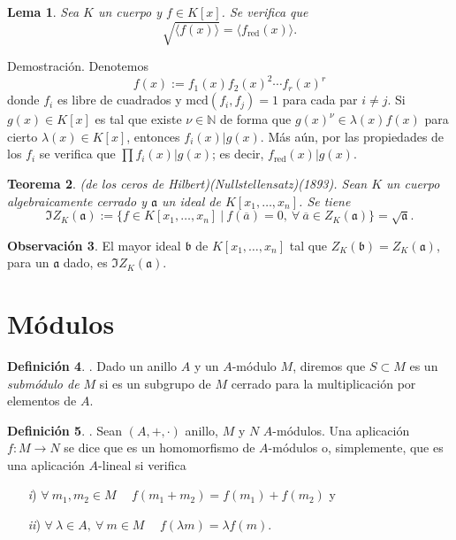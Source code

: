 \documentclass[a4paper,12pt]{article}
\newcommand{\N}{\mathbb{N}}
\newcommand{\af}{\mathfrak{a}}
\newcommand{\bfr}{\mathfrak{b}}
\newtheorem{theorem}{Teorema}
\newtheorem{lemma}[theorem]{Lema}
\theoremstyle{definition}
\newtheorem{definition}[theorem]{Definición}
\newtheorem{remark}[theorem]{Observación}
\begin{document}
\begin{lemma} Sea $K$ un cuerpo y $f\in K[x]$. Se verifica que$$\sqrt{\langle f(x)\rangle}=\langle f_{\text{red}}(x)\rangle.$$
\end{lemma}
Demostración. Denotemos$$f(x):=f_1(x)f_2(x)^2\cdots f_r(x)^r$$donde $f_i$ es libre de cuadrados y $\text{mcd}(f_i,f_j)=1$ para cada par $i\neq j$. Si $g(x)\in K[x]$ es tal que existe $\nu\in\N$ de forma que $g(x)^\nu\in\lambda(x)f(x)$ para cierto $\lambda(x)\in K[x]$, entonces $f_i(x)|g(x)$. Más aún, por las propiedades de los $f_i$ se verifica que $\prod f_i(x)|g(x)$; es decir, $f_\text{red}(x)|g(x)$.

\begin{theorem} (de los ceros de Hilbert)(\textit{Nullstellensatz})(1893). Sean $K$ un cuerpo algebraicamente cerrado y $\af$ un ideal de $K[x_1,\dots,x_n]$. Se tiene$$\mathfrak{I}Z_K(\af):=\{f\in K[x_1,\dots,x_n]\ |\ f(\overline{a})=0,\ \forall\ \overline{a}\in Z_K(\af)\}=\sqrt{\af}.$$
\end{theorem}

\begin{remark} El mayor ideal $\bfr$ de $K[x_1,\dots,x_n]$ tal que $Z_K(\bfr)=Z_K(\af)$, para un $\af$ dado, es $\mathfrak{I}Z_K(\af)$.
\end{remark}

\section{Módulos}
\begin{definition}. Dado un anillo $A$ y un $A$-módulo $M$, diremos que $S\subset M$ es un \textit{submódulo de $M$} si es un subgrupo de $M$ cerrado para la multiplicación por elementos de $A$.
\end{definition}

\begin{definition}. Sean $(A,+,\cdot)$ anillo, $M$ y $N$ $A$-módulos. Una aplicación $f:M\longrightarrow N$ se dice que es un homomorfismo de $A$-módulos o, simplemente, que es una aplicación $A$-lineal si verifica
\begin{itemize}
    \item[\textit{i})] $\forall\ m_1,m_2\in M\hspace{15pt} f(m_1+m_2)=f(m_1)+f(m_2)$ y
    \item[\textit{ii})] $\forall\ \lambda\in A,\ \forall\ m\in M\hspace{15pt} f(\lambda m)=\lambda f(m).$
\end{itemize}
\end{definition}
\end{document}
